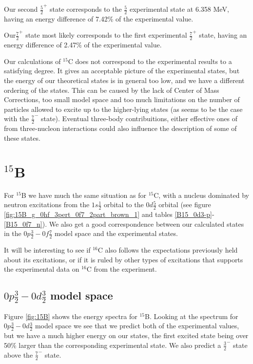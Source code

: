 Our second $\frac52^+$ state corresponds to the $\frac52$ experimental state at
6.358 MeV, having an energy difference of 7.42\% of the experimental value.

Our$\frac72^+$ state most likely corresponds to the first experimental
$\frac72^+$ state, having an energy difference of 2.47\% of the experimental
value.

Our calculations of $^{15}$C does not correspond to the experimental results to
a satisfying degree. It gives an acceptable picture of the experimental states, but
the energy of our theoretical states is in general too low, and we have a
different ordering of the states. This can be caused by the lack of Center of
Mass Corrections, too small model space and too much limitations on the number
of particles allowed to excite up to the higher-lying states (as seems to be
the case with the $\frac72^-$ state). Eventual three-body contribuitions, either effective ones of from
three-nucleon interactions could also influence the description of some of these states.





\section{$^{15}$B}

For $^{15}$B we have much the same situation as for $^{15}$C, with a nucleus
dominated by neutron excitations from the $1s\frac12$ orbital to the
$0d\frac52$ orbital (see figure \ref{fig:15B_g_0hf_3pert_0f7_2part_brown_1} and
tables \ref{B15_0d3-p}-\ref{B15_0f7_n}). We also get a good correspondence
between our calculated states in the $0p\frac32-0f\frac72$ model space and the
experimental states.

It will be interesting to see if $^{16}$C also follows the expectations
previously held about its excitations, or if it is ruled by other types of
excitations that supports the experimental data on $^{16}$C from the
\citet{16CLifetime} experiment.

\subsection{$0p\frac32-0d\frac32$ model space}

Figure \ref{fig:15B} shows the energy spectra for $^{15}$B. Looking at the
spectrum for $0p\frac32-0d\frac32$ model space we see that we predict both of
the experimental values, but we have a much higher energy on our states, the
first excited state being over 50\% larger than the corresponding experimental
state. We also predict a $\frac32^-$ state above the $\frac72^-$ state.

